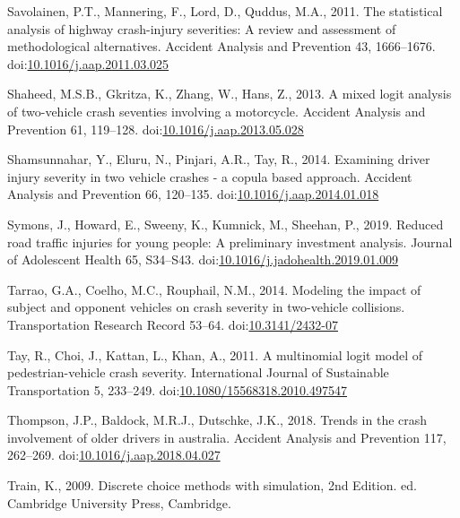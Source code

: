 \documentclass[]{elsarticle} %
\begin{document}
\leavevmode\hypertarget{ref-Savolainen2011statistical}{}%
Savolainen, P.T., Mannering, F., Lord, D., Quddus, M.A., 2011. The
statistical analysis of highway crash-injury severities: A review and
assessment of methodological alternatives. Accident Analysis and
Prevention 43, 1666--1676.
doi:\href{https://doi.org/10.1016/j.aap.2011.03.025}{10.1016/j.aap.2011.03.025}

\leavevmode\hypertarget{ref-Shaheed2013mixed}{}%
Shaheed, M.S.B., Gkritza, K., Zhang, W., Hans, Z., 2013. A mixed logit
analysis of two-vehicle crash seventies involving a motorcycle. Accident
Analysis and Prevention 61, 119--128.
doi:\href{https://doi.org/10.1016/j.aap.2013.05.028}{10.1016/j.aap.2013.05.028}

\leavevmode\hypertarget{ref-Shamsunnahar2014examining}{}%
Shamsunnahar, Y., Eluru, N., Pinjari, A.R., Tay, R., 2014. Examining
driver injury severity in two vehicle crashes - a copula based approach.
Accident Analysis and Prevention 66, 120--135.
doi:\href{https://doi.org/10.1016/j.aap.2014.01.018}{10.1016/j.aap.2014.01.018}

\leavevmode\hypertarget{ref-Symons2019reduced}{}%
Symons, J., Howard, E., Sweeny, K., Kumnick, M., Sheehan, P., 2019.
Reduced road traffic injuries for young people: A preliminary investment
analysis. Journal of Adolescent Health 65, S34--S43.
doi:\href{https://doi.org/10.1016/j.jadohealth.2019.01.009}{10.1016/j.jadohealth.2019.01.009}

\leavevmode\hypertarget{ref-Tarrao2014modeling}{}%
Tarrao, G.A., Coelho, M.C., Rouphail, N.M., 2014. Modeling the impact of
subject and opponent vehicles on crash severity in two-vehicle
collisions. Transportation Research Record 53--64.
doi:\href{https://doi.org/10.3141/2432-07}{10.3141/2432-07}

\leavevmode\hypertarget{ref-Tay2011multinomial}{}%
Tay, R., Choi, J., Kattan, L., Khan, A., 2011. A multinomial logit model
of pedestrian-vehicle crash severity. International Journal of
Sustainable Transportation 5, 233--249.
doi:\href{https://doi.org/10.1080/15568318.2010.497547}{10.1080/15568318.2010.497547}

\leavevmode\hypertarget{ref-Thompson2018trends}{}%
Thompson, J.P., Baldock, M.R.J., Dutschke, J.K., 2018. Trends in the
crash involvement of older drivers in australia. Accident Analysis and
Prevention 117, 262--269.
doi:\href{https://doi.org/10.1016/j.aap.2018.04.027}{10.1016/j.aap.2018.04.027}

\leavevmode\hypertarget{ref-Train2009discrete}{}%
Train, K., 2009. Discrete choice methods with simulation, 2nd Edition.
ed. Cambridge University Press, Cambridge.
\end{document}
